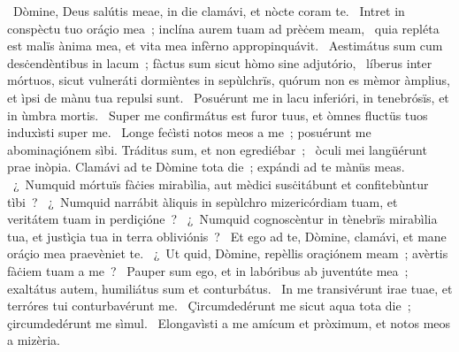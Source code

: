 \psalmChapterWithInscription{}
{ }
{%
~Dòmine, Deus salútis meae, in die clamávi, et nòcte coram te. 
~Intret in conspèctu tuo oráçio mea~; inclína aurem tuam ad prèċem meam, 
~quia repléta est malïs ànima mea, et vita mea infèrno appropinquávit. 
~Aestimátus sum cum desċendèntibus in lacum~; fàctus sum sicut hòmo sine adjutório, 
~líberus inter mórtuos, sicut vulneráti dormièntes in sepùlchrïs, quórum non es mèmor àmplius, et ìpsi de mànu tua repulsi sunt. 
~Posuérunt me in lacu inferióri, in tenebrósïs, et in ùmbra mortis. 
~Super me confirmátus est furor tuus, et òmnes fluctüs tuos induxìsti super me. 
~Longe feċìsti notos meos a me~; posuérunt me abominaçiónem sìbi. Tráditus sum, et non egrediébar~; 
~òculi mei langüérunt prae inòpia. Clamávi ad te Dòmine tota die~; expándi ad te mànüs meas. 
~¿~Numquid mórtuïs fàċies mirabìlia, aut mèdici susċitábunt et confitebùntur tìbi~? 
~¿~Numquid narrábit àliquis in sepùlchro mizericórdiam tuam, et veritátem tuam in perdiçióne~? 
~¿~Numquid cognoscèntur in tènebrïs mirabìlia tua, et justìçia tua in terra obliviónis~? 
~Et ego ad te, Dòmine, clamávi, et mane oráçio mea praevèniet te. 
~¿~Ut quid, Dòmine, repèllis oraçiónem meam~; avèrtis fàċiem tuam a me~? 
~Pauper sum ego, et in labóribus ab juventúte mea~; exaltátus autem, humiliátus sum et conturbátus. 
~In me transivérunt irae tuae, et terróres tui conturbavérunt me. 
~Çircumdedérunt me sicut aqua tota die~; çircumdedérunt me sìmul. 
~Elongavìsti a me amícum et pròximum, et notos meos a mizèria. 
}
